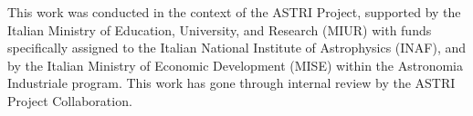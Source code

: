 \date{Received: date / Accepted: date}

\maketitle

\begin{abstract}
.....


\keywords{}
\end{abstract}







\begin{acknowledgements}
This work was conducted in the context of the ASTRI Project, supported by the Italian Ministry of Education, University, and Research (MIUR) with funds specifically assigned to the Italian National Institute of Astrophysics (INAF), and by the Italian Ministry of Economic Development (MISE) within the Astronomia Industriale program. This work has gone through internal review by the ASTRI Project Collaboration.
\end{acknowledgements}







